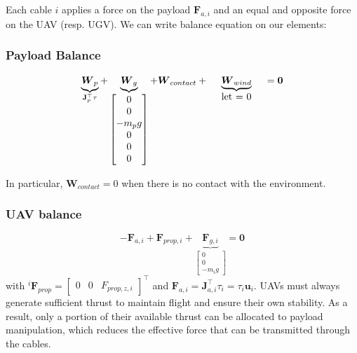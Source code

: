 Each cable $i$ applies a force on the payload $\mathbf{F}_{a, i}$ and an equal and opposite force on the UAV (resp. UGV). We can write balance equation on our elements:

\subsubsection{Payload Balance}
\begin{equation}
    \underbrace{\boldsymbol{W}_p}_ {\mathbf{J}_p^\top \tau } + \underbrace{\boldsymbol{W}_g}_{\begin{bmatrix}
        0 \\0 \\ - m_p g \\ 0\\ 0\\ 0\\
    \end{bmatrix}} + \boldsymbol{W}_{contact}
 + \underbrace{\boldsymbol{W}_{wind}}_{\parbox{2cm}{\centering let = 0}} = \mathbf{0}
 \label{eq:payloadbalance}
\end{equation}

In particular, $\boldsymbol{W}_{contact} = 0$ when there is no contact with the environment.

\subsubsection{UAV balance} %
\begin{equation}
    -\boldsymbol{F}_{a,i} + \boldsymbol{F}_{prop, i} + \underbrace{\boldsymbol{F}_{g,i}}_{\begin{bmatrix}
        0 \\ 0 \\ - m_{i} g
    \end{bmatrix}} = \mathbf{0}
    \label{eq:uavbalance}
\end{equation}
with $^i \boldsymbol{F}_{prop} = \begin{bmatrix}
        0 & 0 & F_{prop,z,i}
    \end{bmatrix}^\top$ and $\mathbf{F}_{a, i} = \mathbf{J}_{a, i}^\top \tau_i = \tau_i \mathbf{u}_i$.
UAVs must always generate sufficient thrust to maintain flight and ensure their own stability. As a result, only a portion of their available thrust can be allocated to payload manipulation, which reduces the effective force that can be transmitted through the cables.

